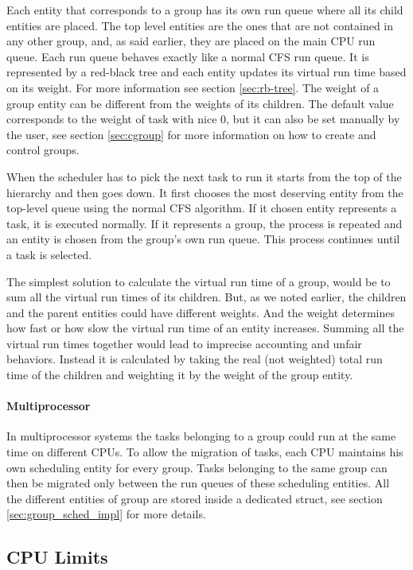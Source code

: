 Each entity that corresponds to a group has its own run queue where all its child entities are placed. The top level entities are the ones that are not contained in any other group, and, as said earlier, they are placed on the main CPU run queue. Each run queue behaves exactly like a normal CFS run queue. It is represented by a red-black tree and each entity updates its virtual run time based on its weight. For more information see section \ref{sec:rb-tree}. The weight of a group entity can be different from the weights of its children. The default value corresponds to the weight of task with nice 0, but it can also be set manually by the user, see section \ref{sec:cgroup} for more information on how to create and control groups.

When the scheduler has to pick the next task to run it starts from the top of the hierarchy and then goes down. It first chooses the most deserving entity from the top-level queue using the normal CFS algorithm. If it chosen entity represents a task, it is executed normally. If it represents a group, the process is repeated and an entity is chosen from the group's own run queue. This process continues until a task is selected.

The simplest solution to calculate the virtual run time of a group, would be to sum all the virtual run times of its children. But, as we noted earlier, the children and the parent entities could have different weights. And the weight determines how fast or how slow the virtual run time of an entity increases. Summing all the virtual run times together would lead to imprecise accounting and unfair behaviors. Instead it is calculated by taking the real (not weighted) total run time of the children and weighting it by the weight of the group entity.

\paragraph{Multiprocessor}
In multiprocessor systems the tasks belonging to a group could run at the same time on different CPUs. To allow the migration of tasks, each CPU maintains his own scheduling entity for every group. Tasks belonging to the same group can then be migrated only between the run queues of these scheduling entities. All the different entities of group are stored inside a dedicated struct, see section \ref{sec:group_sched_impl} for more details.

\subsection{CPU Limits}%

